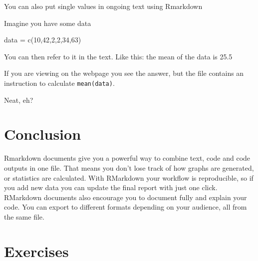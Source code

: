 \documentclass[
  12pt,
  a5paper,
]{book}
\newenvironment{Shaded}{\begin{snugshade}}{\end{snugshade}}
\newcommand{\DecValTok}[1]{\textcolor[rgb]{0.00,0.00,0.81}{#1}}
\newcommand{\FunctionTok}[1]{\textcolor[rgb]{0.00,0.00,0.00}{#1}}
\newcommand{\NormalTok}[1]{#1}
\newcommand{\OtherTok}[1]{\textcolor[rgb]{0.56,0.35,0.01}{#1}}
\begin{document}
You can also put single values in ongoing text using Rmarkdown

Imagine you have some data

\begin{Shaded}
\begin{Highlighting}[]
\NormalTok{data }\OtherTok{=} \FunctionTok{c}\NormalTok{(}\DecValTok{10}\NormalTok{,}\DecValTok{42}\NormalTok{,}\DecValTok{2}\NormalTok{,}\DecValTok{2}\NormalTok{,}\DecValTok{34}\NormalTok{,}\DecValTok{63}\NormalTok{)}
\end{Highlighting}
\end{Shaded}

You can then refer to it in the text. Like this: the mean of the data is 25.5

If you are viewing on the webpage you see the answer, but the file contains an instruction to calculate \texttt{mean(data)}.

Neat, eh?

\hypertarget{conclusion}{%
\section{Conclusion}\label{conclusion}}

Rmarkdown documents give you a powerful way to combine text, code and code outputs in one file. That means you don't lose track of how graphs are generated, or statistics are calculated. With RMarkdown your workflow is reproducible, so if you add new data you can update the final report with just one click. RMarkdown documents also encourage you to document fully and explain your code. You can export to different formats depending on your audience, all from the same file.

\hypertarget{exercises-3}{%
\section{Exercises}\label{exercises-3}}
\end{document}
